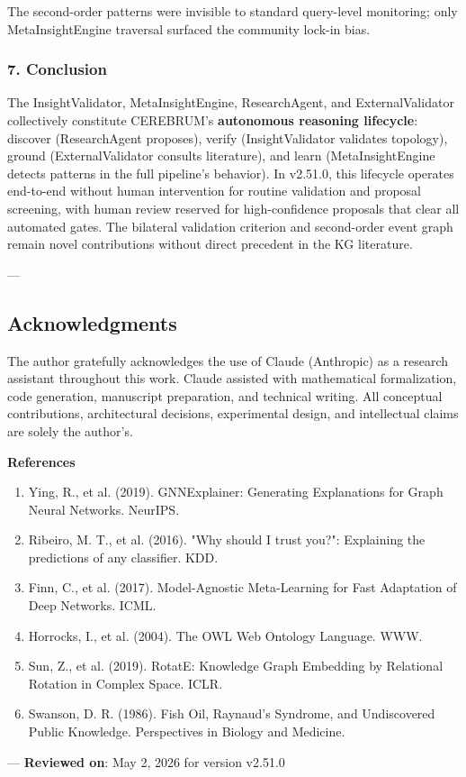 The second-order patterns were invisible to standard query-level monitoring; only MetaInsightEngine traversal surfaced the community lock-in bias.

\subsubsection{7. Conclusion}
The InsightValidator, MetaInsightEngine, ResearchAgent, and ExternalValidator colle\-ctively constitute CEREBRUM's \textbf{autonomous reasoning lifecycle}: discover (ResearchAgent proposes), verify (InsightValidator validates topology), ground (ExternalValidator consults literature), and learn (MetaInsightEngine detects patterns in the full pipeline's behavior). In v2.51.0, this lifecycle operates end-to-end without human inter\-vention for routine validation and proposal screening, with human review reserved for high-confidence proposals that clear all automated gates. The bilateral validation criterion and second-order event graph remain novel contr\-ibutions without direct precedent in the KG literature.

---
\subsection{Acknow\-ledgments}

The author gratefully ackno\-wledges the use of Claude (Anthropic) as a research assistant throughout this work. Claude assisted with mathe\-matical forma\-lization, code generation, manuscript preparation, and technical writing. All conceptual contr\-ibutions, archi\-tectural decisions, exper\-imental design, and intel\-lectual claims are solely the author's.

\textbf{References}
\begin{enumerate}
\item Ying, R., et al. (2019). GNNExplainer: Generating Explan\-ations for Graph Neural Networks. NeurIPS.
\item Ribeiro, M. T., et al. (2016). "Why should I trust you?": Explaining the predictions of any classifier. KDD.
\item Finn, C., et al. (2017). Model-Agnostic Meta-Learning for Fast Adaptation of Deep Networks. ICML.
\item Horrocks, I., et al. (2004). The OWL Web Ontology Language. WWW.
\item Sun, Z., et al. (2019). RotatE: Knowledge Graph Embedding by Relational Rotation in Complex Space. ICLR.
\item Swanson, D. R. (1986). Fish Oil, Raynaud's Syndrome, and Undisc\-overed Public Knowledge. Perspe\-ctives in Biology and Medicine.

\end{enumerate}
---
\textbf{Reviewed on}: May 2, 2026 for version v2.51.0
